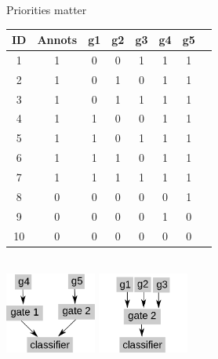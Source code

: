 \documentclass[10pt,dvipsnames]{beamer}
\begin{document}
\begin{frame}{Priorities matter}
 \begin{center}
 
 \begin{tabular}{|c|c|c|c|c|c|c|c|}
  \hline
  ID&	Annots&	g1&	g2&	g3& g4& g5\\
  \hline
  1&	1&	0&	0&	1& 1& 1\\
  2&	1&	0&	1&	0& 1& 1\\
  3&	1&	0&	1&	1& 1& 1\\
  4&	1&	1&	0&	0& 1& 1\\
  5&	1&	1&	0&	1& 1& 1\\
  6&	1&	1&	1&	0& 1& 1\\
  7&	1&	1&	1&	1& 1& 1\\
  8&	0&	0&	0&	0& 0& 1\\
  9&	0&	0&	0&	0& 1& 0\\
  10&	0&	0&	0&	0& 0& 0\\
  \hline
 \end{tabular}\\\vspace{1cm}
 \includegraphics[width=3cm]{optimization_01.png}
 \hspace{1cm}
 \includegraphics[width=3cm]{optimization_02.png}
 \end{center}
\end{frame}
\end{document}
